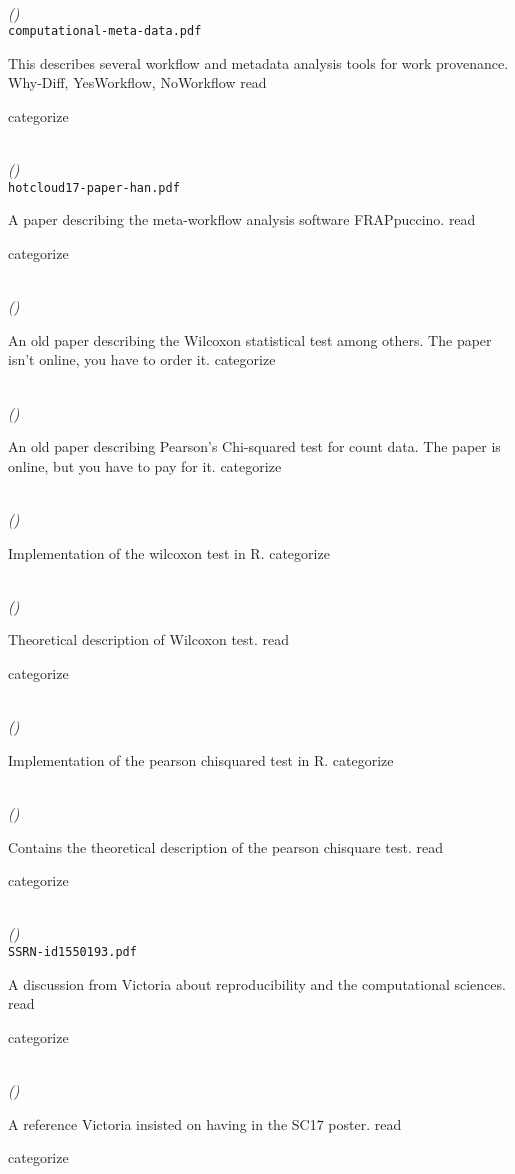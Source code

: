 \documentclass{article}
\newcommand{\Read}{
	\gls{read}
}
\newcommand{\categorize}{
	\gls{categorize}
}
\newenvironment{refdef}[2] {
	\noindent \textbf{\citetitle{#1}} \cite{#1}\\ \citejournalorbooktitle{#1} \textit{(\citeyear{#1})}\\ \texttt{#2} \vspace{0.2in} \par 
} {
\vspace{0.2in}
}
\begin{document}
\begin{refdef}{computational-meta-data}{computational-meta-data.pdf}
This describes several workflow and metadata analysis tools for work provenance. Why-Diff, YesWorkflow, NoWorkflow \Read \categorize
\end{refdef}

\begin{refdef}{FRAPpuccino}{hotcloud17-paper-han.pdf}
A paper describing the meta-workflow analysis software FRAPpuccino. \Read \categorize
\end{refdef}

\begin{refdef}{doi:10.1080/01621459.1972.10481279}{}
An old paper describing the Wilcoxon statistical test among others. The paper isn't online, you have to order it. \categorize
\end{refdef}

\begin{refdef}{10.2307/2984263}{}
An old paper describing Pearson's Chi-squared test for count data. The paper is online, but you have to pay for it. \categorize
\end{refdef}

\begin{refdef}{R-wilcoxon-test}{}
Implementation of the wilcoxon test in R. \categorize
\end{refdef}

\begin{refdef}{wilcoxon-test}{}
Theoretical description of Wilcoxon test. \Read \categorize
\end{refdef}

\begin{refdef}{R-pearson-chisquare}{}
Implementation of the pearson chisquared test in R. \categorize
\end{refdef}

\begin{refdef}{pearson-chisquare}{}
Contains the theoretical description of the pearson chisquare test. \Read \categorize
\end{refdef}

\begin{refdef}{stodden-reproducibility-scientific-method}{SSRN-id1550193.pdf}
A discussion from Victoria about reproducibility and the computational sciences. \Read \categorize
\end{refdef}

\begin{refdef}{taufer-sc-reproducibility}{}
A reference Victoria insisted on having in the SC17 poster. \Read \categorize
\end{refdef}
\end{document}
